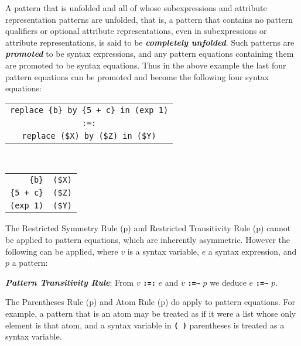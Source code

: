 \documentclass[12pt]{article}
\newcommand{\TT}[1]{{\tt \bfseries #1}}
\newcommand{\key}[1]{{\bf \em #1}\index{#1}}
\newcommand{\ikey}[2]{{\bf \em #1}\index{#2}}
\newcommand{\pagref}[1]{p\pageref{#1}}
\newcommand{\TILDE}{\textasciitilde}
\newenvironment{indpar}[1][0.3in]%
	{\begin{list}{}%
		     {\setlength{\itemsep}{0in}%
		      \setlength{\topsep}{0in}%
		      \setlength{\parsep}{1ex}%
		      \setlength{\labelwidth}{#1}%
		      \setlength{\leftmargin}{#1}%
		      \addtolength{\leftmargin}{\labelsep}}%
	 \item}%
	{\end{list}}
\begin{document}
A pattern that is unfolded and all of whose subexpressions
and attribute representation patterns are
unfolded, that is, a pattern that contains no pattern qualifiers or
optional attribute representations,
even in subexpressions or attribute representations,
is said to be \key{completely unfolded}.
Such patterns are \key{promoted} to be syntax expressions, and
any pattern equations containing them are promoted to be
syntax equations.  Thus in the above example the last four
pattern equations can be promoted and become the following
four syntax equations:

\begin{center}
\begin{tabular}{c}
\verb/replace {b} by {5 + c} in (exp 1)/ \\
\verb/:=:/ \\
\verb/replace ($X) by ($Z) in ($Y)/ \\
\end{tabular} \\[2ex]
\begin{tabular}{r@\TT{~:=:~}l}
\verb/{b}/ & \verb/($X)/ \\
\verb/{5 + c}/ & \verb/($Z)/ \\
\verb/(exp 1)/ & \verb/($Y)/ \\
\end{tabular}
\end{center}

The Restricted Symmetry Rule (\pagref{RESTRICTED-SYMMETRY-RULE})
and Restricted Transitivity Rule (\pagref{RESTRICTED-TRANSITIVITY-RULE})
cannot be applied to pattern equations, which are inherently asymmetric.
However the following can be applied, where $v$ is a syntax variable, $e$
a syntax expression, and $p$ a pattern:

\begin{indpar}
\begin{list}{}{}
\item [\ikey{Pattern Transitivity Rule}{pattern transitivity rule}:]%
\label{PATTERN-TRANSITIVITY-RULE}
From $v$ \TT{:=:} $e$ and $v$ \TT{:=\TILDE} $p$
we deduce $e$ \TT{:=\TILDE} $p$.
\end{list}
\end{indpar}

The Parentheses Rule (\pagref{PARENTHESES-RULE})
and Atom Rule (\pagref{ATOM-RULE}) do apply to pattern equations.
For example, a pattern that is an atom may be treated as if it were
a list whose only element is that atom, and a syntax variable in
\TT{( )} parentheses is treated as a syntax variable.
\end{document}
